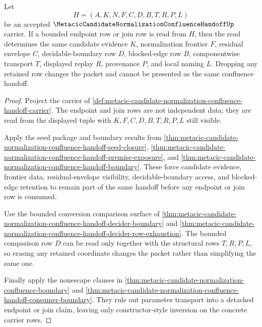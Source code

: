 \begin{theorem}
\label{thm:metacic-candidate-normalization-confluence-retained-premise-inversion}
Let
$$
H=(A,K,N,F,C,D,B,T,R,P,L)
$$
be an accepted $\MetacicCandidateNormalizationConfluenceHandoffUp$ carrier. If a bounded endpoint row or join row is read from $H$, then the read determines the same candidate evidence $K$, normalization frontier $F$, residual envelope $C$, decidable-boundary row $D$, blocked-edge row $B$, componentwise transport $T$, displayed replay $R$, provenance $P$, and local naming $L$. Dropping any retained row changes the packet and cannot be presented as the same confluence handoff.
\end{theorem}
\begin{proof}
Project the carrier of \autoref{def:metacic-candidate-normalization-confluence-handoff-carrier}. The endpoint and join rows are not independent data; they are read from the displayed tuple with $K,F,C,D,B,T,R,P,L$ still visible.

Apply the seed package and boundary results from \autoref{thm:metacic-candidate-normalization-confluence-handoff-seed-closure}, \autoref{thm:metacic-candidate-normalization-confluence-handoff-premise-exposure}, and \autoref{thm:metacic-candidate-normalization-confluence-handoff-boundary}. These force candidate evidence, frontier data, residual-envelope visibility, decidable-boundary access, and blocked-edge retention to remain part of the same handoff before any endpoint or join row is consumed.

Use the bounded conversion comparison surface of \autoref{thm:metacic-candidate-normalization-confluence-handoff-decider-boundary} and \autoref{thm:metacic-candidate-normalization-confluence-handoff-decider-row-exhaustion}. The bounded comparison row $D$ can be read only together with the structural rows $T,R,P,L$, so erasing any retained coordinate changes the packet rather than simplifying the same one.

Finally apply the nonescape clauses in \autoref{thm:metacic-candidate-normalization-confluence-boundary} and \autoref{thm:metacic-candidate-normalization-confluence-handoff-consumer-boundary}. They rule out parameter transport into a detached endpoint or join claim, leaving only constructor-style inversion on the concrete carrier rows.
\end{proof}

